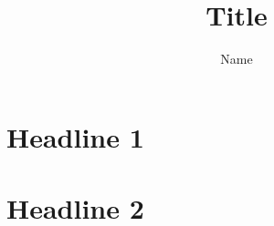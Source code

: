 \documentclass[12pt]{article}
\title{Title}
\author{Name}
\begin{document}
\maketitle
\section{Headline 1}
\section{Headline 2}
\subsection{}
\subsection{}
\end{document}
